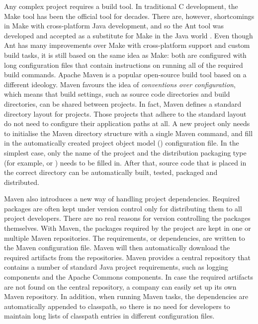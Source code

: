 Any complex project requires a build tool. In traditional C 
development, the Make tool has been the official tool for decades. 
There are, however, shortcomings in Make with cross-platform Java 
development, and so the Ant tool was developed and accepted as a 
substitute for Make in the Java world \citep{ant}. Even though Ant has 
many improvements over Make with cross-platform support and custom 
build tasks, it is still based on the same idea as Make: both are 
configured with long configuration files that contain instructions on 
running all of the required build commands. Apache Maven \citep{maven} 
is a popular open-source build tool based on a different ideology. 
Maven favours the idea of \textsl{conventions over configuration}, 
which means that build settings, such as source code directories and 
build directories, can be shared between projects. In fact, Maven 
defines a standard directory layout for projects. Those projects that 
adhere to the standard layout do not need to configure their 
application paths at all. A new project only needs to initialise the 
Maven directory structure with a single Maven command, and fill in the 
automatically created project object model () 
configuration file. In the simplest case, only the name of the project 
and the distribution packaging type (for example,  or 
) needs to be filled in. After that, source code that is 
placed in the correct directory can be automatically built, tested, 
packaged and distributed. \citep{maven,mavenintro}

Maven also introduces a new way of handling project dependencies. 
Required  packages are often kept under version control 
only for distributing them to all project developers. There are no 
real reasons for version controlling the packages themselves. With 
Maven, the packages required by the project are kept in one or 
multiple Maven repositories. The requirements, or dependencies, are 
written to the Maven configuration file. Maven will then automatically 
download the required artifacts from the repositories. Maven provides 
a central repository that contains a number of standard Java project 
requirements, such as logging components and the Apache Commons 
\citep{commons} components. In case the required artifacts are not 
found on the central repository, a company can easily set up its own 
Maven repository. In addition, when running Maven tasks, the 
dependencies are automatically appended to classpath, so there is no 
need for developers to maintain long lists of classpath entries in 
different configuration files. \citep{maven}


